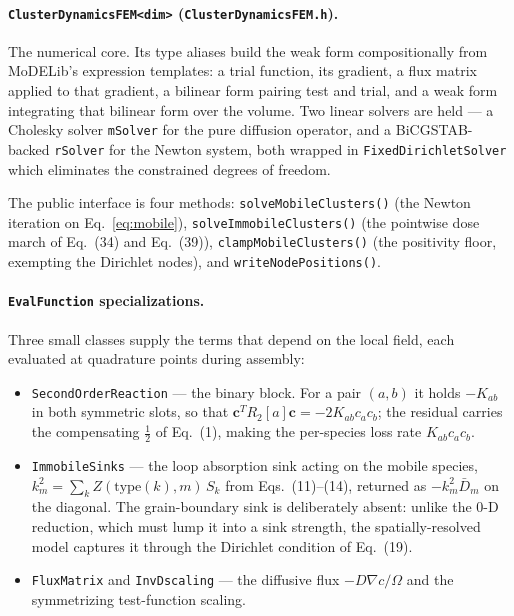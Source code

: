 \documentclass[11pt]{article}
\newcommand{\code}[1]{\texttt{\small #1}}
\newcommand{\file}[1]{\texttt{\footnotesize #1}}
\newcommand{\dref}[1]{Eq.~(#1)}
\newcommand{\drefs}[2]{Eqs.~(#1)--(#2)}
\begin{document}
\paragraph*{\code{ClusterDynamicsFEM<dim>} (\file{ClusterDynamicsFEM.h}).}
The numerical core. Its type aliases build the weak form compositionally from
MoDELib's expression templates: a trial function, its gradient, a flux matrix
applied to that gradient, a bilinear form pairing test and trial, and a weak form
integrating that bilinear form over the volume. Two linear solvers are held --- a
Cholesky solver \code{mSolver} for the pure diffusion operator, and a
BiCGSTAB-backed \code{rSolver} for the Newton system, both wrapped in
\code{FixedDirichletSolver} which eliminates the constrained degrees of freedom.

The public interface is four methods:
\code{solveMobileClusters()} (the Newton iteration on Eq.~\eqref{eq:mobile}),
\code{solveImmobileClusters()} (the pointwise dose march of \dref{34} and
\dref{39}), \code{clampMobileClusters()} (the positivity floor, exempting the
Dirichlet nodes), and \code{writeNodePositions()}.

\paragraph*{\code{EvalFunction} specializations.}
Three small classes supply the terms that depend on the local field, each
evaluated at quadrature points during assembly:

\begin{itemize}
\item \code{SecondOrderReaction} --- the binary block. For a pair $(a,b)$ it
holds $-K_{ab}$ in both symmetric slots, so that $\boldsymbol{c}^T R_2[a]
\boldsymbol{c} = -2K_{ab}c_a c_b$; the residual carries the compensating
$\tfrac12$ of \dref{1}, making the per-species loss rate $K_{ab}c_a c_b$.
\item \code{ImmobileSinks} --- the loop absorption sink acting on the mobile
species, $k^2_m = \sum_k Z(\text{type}(k),m)\,S_k$ from \drefs{11}{14}, returned
as $-k^2_m\bar{D}_m$ on the diagonal. The grain-boundary sink is deliberately
absent: unlike the 0-D reduction, which must lump it into a sink strength, the
spatially-resolved model captures it through the Dirichlet condition of
\dref{19}.
\item \code{FluxMatrix} and \code{InvDscaling} --- the diffusive flux
$-D\nabla c/\Omega$ and the symmetrizing test-function scaling.
\end{itemize}
\end{document}
